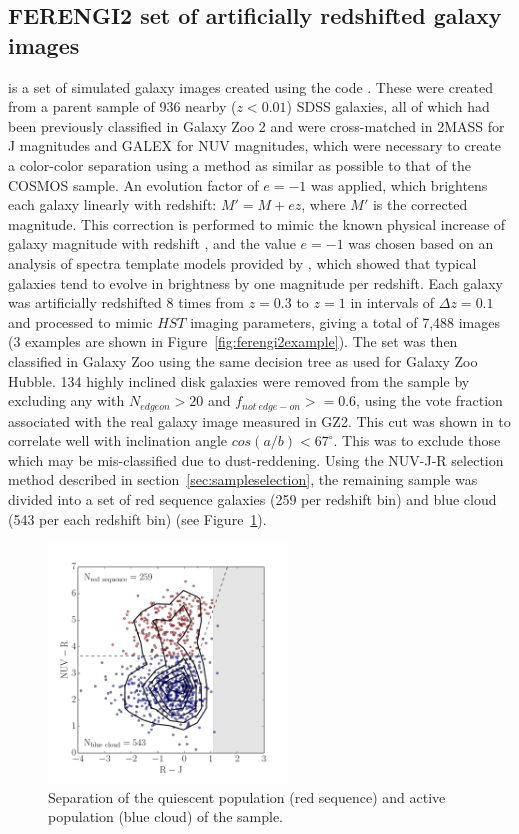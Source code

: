\documentclass[useAMS,usenatbib]{mn2e}
\begin{document}
\subsection{FERENGI2 set of artificially redshifted galaxy images}
\label{ssec:ferengi}
 is a set of simulated galaxy images created using the \ferengi{} code \citep{Barden2008}. These were created from a parent sample of 936 nearby ($z<0.01$) SDSS galaxies, all of which had been previously classified in Galaxy Zoo 2 and were cross-matched in 2MASS \citep{Skrutskie2006} for J magnitudes and GALEX \citep{Martin2005} for NUV magnitudes, which were necessary to create a color-color separation using a method as similar as possible to that of the COSMOS sample.  An evolution factor of $e=-1$ was applied, which brightens each galaxy linearly with redshift: $M' = M + ez$, where $M'$ is the corrected magnitude. This correction is performed to mimic the known physical increase of galaxy magnitude with redshift \citep{Lilly1998,Loveday2011}, and the value $e=-1$ was chosen based on an analysis of spectra template models provided by \citet{Brinchmann2004a}, which showed that typical galaxies tend to evolve in brightness by one magnitude per redshift. Each galaxy was artificially redshifted 8 times from $z=0.3$ to $z=1$ in intervals of $\Delta z = 0.1$ and processed to mimic $HST$ imaging parameters, giving a total of 7,488 images (3 examples are shown in Figure~\ref{fig:ferengi2example}).  The set was then classified in Galaxy Zoo using the same decision tree as used for Galaxy Zoo Hubble. 134 highly inclined disk galaxies were removed from the sample by excluding any with $N_{edgeon}>20$ and $f_{not~edge-on}>=0.6$, using the vote fraction associated with the real galaxy image measured in GZ2. This cut was shown in \citet{Galloway2015} to correlate well with inclination angle $cos(a/b)<67^\circ$. This was to exclude those which may be mis-classified due to dust-reddening.  Using the NUV-J-R selection method described in section~\ref{sec:sampleselection}, the remaining sample was divided into a set of red sequence galaxies (259 per redshift bin) and blue cloud (543 per each redshift bin) (see Figure~\ref{fig:ferengi2colorcolor}).

\begin{figure}
\centering
\includegraphics[width=2.5in,height=2.5in,trim={.5cm 0cm .5cm 0cm},clip]{figures/ferengi2_colorcolor.pdf}
\caption{Separation of the quiescent population (red sequence) and active population (blue cloud) of the  sample.}
\label{fig:ferengi2colorcolor}
\end{figure}
\end{document}
